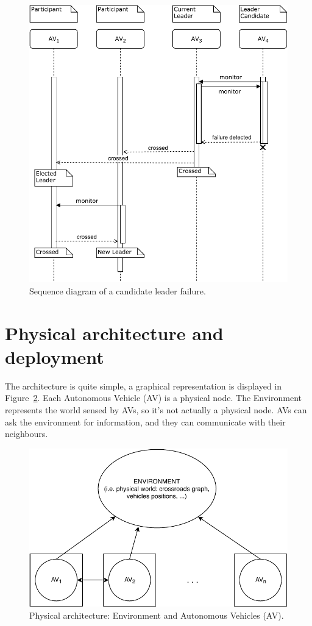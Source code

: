 \documentclass{memoir}
\begin{document}
\begin{figure}
	\centering
	\includegraphics[width=\linewidth]{sequence_diagrams/candidate_failure.pdf}
	\caption{Sequence diagram of a candidate leader failure.}
	\label{fig:seq-diag-candidate-failure}
\end{figure}

\section{Physical architecture and deployment}
The architecture is quite simple, a graphical representation is displayed in Figure~\ref{fig:physical-architecture}. Each Autonomous Vehicle (AV) is a physical node. The Environment represents the world sensed by AVs, so it's not actually a physical node. AVs can ask the environment for information, and they can communicate with their neighbours.

\begin{figure}
	\centering
	\includegraphics[width=0.8\linewidth]{physical_architecture.pdf}
	\caption{Physical architecture: Environment and Autonomous Vehicles (AV).}
	\label{fig:physical-architecture}
\end{figure}
\end{document}
